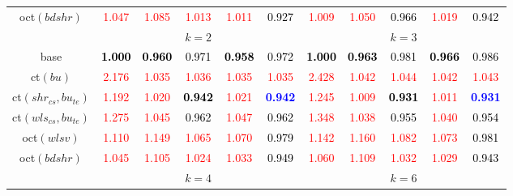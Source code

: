 \begin{tabular}[t]{c|>{}cccc>{}c|ccccc}
oct$(bdshr)$ & \textcolor{red}{1.047} & \textcolor{red}{1.085} & \textcolor{red}{1.013} & \textcolor{red}{1.011} & \textcolor{black}{0.927} & \textcolor{red}{1.009} & \textcolor{red}{1.050} & \textcolor{black}{0.966} & \textcolor{red}{1.019} & \textcolor{black}{0.942}\\
\addlinespace[0.3em]
\multicolumn{1}{c}{} & \multicolumn{5}{c}{\textbf{$k = 2$}} & \multicolumn{5}{c}{\textbf{$k = 3$}}\\
base & \textcolor{black}{\textbf{1.000}} & \textcolor{black}{\textbf{0.960}} & \textcolor{black}{0.971} & \textcolor{black}{\textbf{0.958}} & \textcolor{black}{0.972} & \textcolor{black}{\textbf{1.000}} & \textcolor{black}{\textbf{0.963}} & \textcolor{black}{0.981} & \textcolor{black}{\textbf{0.966}} & \textcolor{black}{0.986}\\
ct$(bu)$ & \textcolor{red}{2.176} & \textcolor{red}{1.035} & \textcolor{red}{1.036} & \textcolor{red}{1.035} & \textcolor{red}{1.035} & \textcolor{red}{2.428} & \textcolor{red}{1.042} & \textcolor{red}{1.044} & \textcolor{red}{1.042} & \textcolor{red}{1.043}\\
ct$(shr_{cs}, bu_{te})$ & \textcolor{red}{1.192} & \textcolor{red}{1.020} & \textcolor{black}{\textbf{0.942}} & \textcolor{red}{1.021} & \textcolor{blue}{\textbf{0.942}} & \textcolor{red}{1.245} & \textcolor{red}{1.009} & \textcolor{black}{\textbf{0.931}} & \textcolor{red}{1.011} & \textcolor{blue}{\textbf{0.931}}\\
ct$(wls_{cs}, bu_{te})$ & \textcolor{red}{1.275} & \textcolor{red}{1.045} & \textcolor{black}{0.962} & \textcolor{red}{1.047} & \textcolor{black}{0.962} & \textcolor{red}{1.348} & \textcolor{red}{1.038} & \textcolor{black}{0.955} & \textcolor{red}{1.040} & \textcolor{black}{0.954}\\
oct$(wlsv)$ & \textcolor{red}{1.110} & \textcolor{red}{1.149} & \textcolor{red}{1.065} & \textcolor{red}{1.070} & \textcolor{black}{0.979} & \textcolor{red}{1.142} & \textcolor{red}{1.160} & \textcolor{red}{1.082} & \textcolor{red}{1.073} & \textcolor{black}{0.981}\\
oct$(bdshr)$ & \textcolor{red}{1.045} & \textcolor{red}{1.105} & \textcolor{red}{1.024} & \textcolor{red}{1.033} & \textcolor{black}{0.949} & \textcolor{red}{1.060} & \textcolor{red}{1.109} & \textcolor{red}{1.032} & \textcolor{red}{1.029} & \textcolor{black}{0.943}\\
\addlinespace[0.3em]
\multicolumn{1}{c}{} & \multicolumn{5}{c}{\textbf{$k = 4$}} & \multicolumn{5}{c}{\textbf{$k = 6$}}\\

\end{tabular}
